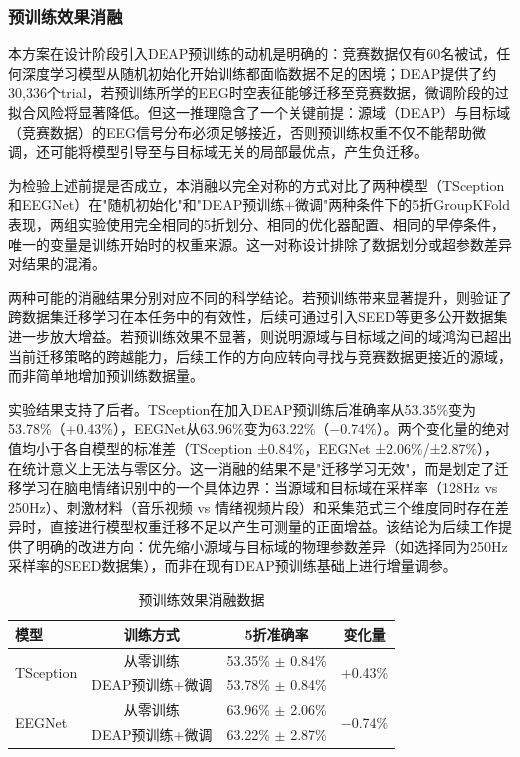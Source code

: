 \documentclass[UTF8,zihao=-4,fontset=windows]{ctexart}
\numberwithin{equation}{section}
\numberwithin{figure}{section}
\numberwithin{table}{section}
\begin{document}
\subsubsection{预训练效果消融}

本方案在设计阶段引入DEAP预训练的动机是明确的：竞赛数据仅有60名被试，任何深度学习模型从随机初始化开始训练都面临数据不足的困境；DEAP提供了约30,336个trial，若预训练所学的EEG时空表征能够迁移至竞赛数据，微调阶段的过拟合风险将显著降低。但这一推理隐含了一个关键前提：源域（DEAP）与目标域（竞赛数据）的EEG信号分布必须足够接近，否则预训练权重不仅不能帮助微调，还可能将模型引导至与目标域无关的局部最优点，产生负迁移。

为检验上述前提是否成立，本消融以完全对称的方式对比了两种模型（TSception和EEGNet）在"随机初始化"和"DEAP预训练+微调"两种条件下的5折GroupKFold表现，两组实验使用完全相同的5折划分、相同的优化器配置、相同的早停条件，唯一的变量是训练开始时的权重来源。这一对称设计排除了数据划分或超参数差异对结果的混淆。

两种可能的消融结果分别对应不同的科学结论。若预训练带来显著提升，则验证了跨数据集迁移学习在本任务中的有效性，后续可通过引入SEED等更多公开数据集进一步放大增益。若预训练效果不显著，则说明源域与目标域之间的域鸿沟已超出当前迁移策略的跨越能力，后续工作的方向应转向寻找与竞赛数据更接近的源域，而非简单地增加预训练数据量。

实验结果支持了后者。TSception在加入DEAP预训练后准确率从53.35\%变为53.78\%（+0.43\%），EEGNet从63.96\%变为63.22\%（−0.74\%）。两个变化量的绝对值均小于各自模型的标准差（TSception ±0.84\%，EEGNet ±2.06\%/\allowbreak±2.87\%），在统计意义上无法与零区分。这一消融的结果不是"迁移学习无效"，而是划定了迁移学习在脑电情绪识别中的一个具体边界：当源域和目标域在采样率（128Hz vs 250Hz）、刺激材料（音乐视频 vs 情绪视频片段）和采集范式三个维度同时存在差异时，直接进行模型权重迁移不足以产生可测量的正面增益。该结论为后续工作提供了明确的改进方向：优先缩小源域与目标域的物理参数差异（如选择同为250Hz采样率的SEED数据集），而非在现有DEAP预训练基础上进行增量调参。

\begin{table}[H]
\centering
\caption{预训练效果消融数据}
\label{tab:ablation_pretrain}
\begin{tabular}{lccc}
\toprule
\textbf{模型} & \textbf{训练方式} & \textbf{5折准确率} & \textbf{变化量} \\
\midrule
\multirow{2}{*}{TSception} & 从零训练 & 53.35\% $\pm$ 0.84\% & \multirow{2}{*}{+0.43\%} \\
                           & DEAP预训练+微调 & 53.78\% $\pm$ 0.84\% & \\
\multirow{2}{*}{EEGNet}    & 从零训练 & 63.96\% $\pm$ 2.06\% & \multirow{2}{*}{−0.74\%} \\
                           & DEAP预训练+微调 & 63.22\% $\pm$ 2.87\% & \\
\bottomrule
\end{tabular}
\end{table}
\end{document}
